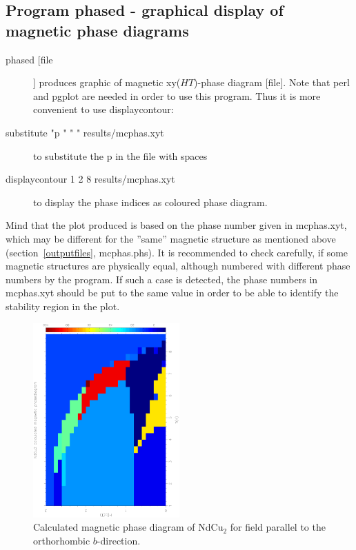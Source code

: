 \clearpage

\subsection{Program {\prg phased} - graphical display of magnetic phase diagrams}
\begin{description}
\item [phased    [file]]       produces graphic of magnetic xy($HT$)-phase diagram [file]. Note that
{\prg perl} and {\prg pgplot} are needed in order to use this program. Thus it is more
convenient to use {\prg displaycontour}:
\item [substitute "p " "  " results/mcphas.xyt] to substitute the p in the file with spaces
\item [displaycontour 1 2 8 results/mcphas.xyt] to display the phase indices as coloured phase diagram.
\end{description}

Mind that the plot produced is based on the phase number given in {\prg mcphas.xyt}, which may be
different for the ''same'' magnetic structure as mentioned above
(section~\ref{outputfiles}, {\prg mcphas.phs}). It is recommended to check carefully, if
some magnetic structures are physically equal, although numbered with different phase numbers by
the program. If such a case is detected, the phase numbers in {\prg mcphas.xyt} should
be put to the same value in order to be able to identify the stability region in the plot.

\begin{figure}[hb]%
\begin{center}\leavevmode
\includegraphics[angle=-90, width=0.5\textwidth]{figsrc/ndcu2b/resultss/phased.ps}
\end{center}
\caption{Calculated magnetic phase diagram of NdCu$_2$ for field parallel to the orthorhombic $b$-direction.}
\label{phasediagramgraphic}
\end{figure}
\clearpage


